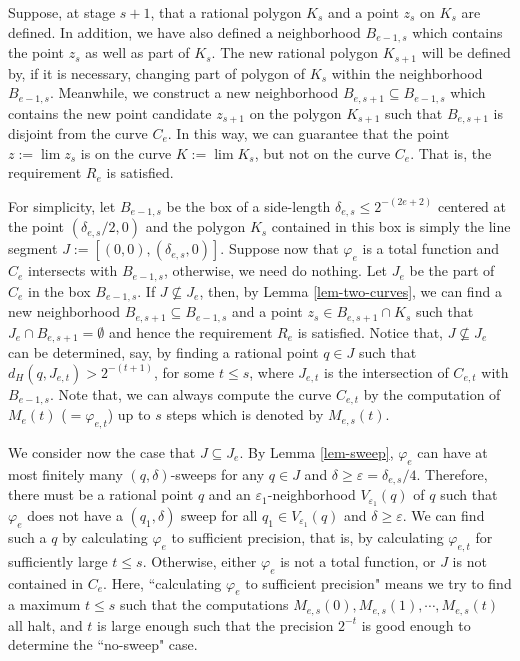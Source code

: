 \documentclass{LMCS}
\theoremstyle{plain}
\begin{document}
Suppose, at stage $s+1$, that a rational polygon $K_s$ and a point $z_s$ on $K_s$ are defined. In addition, we have also defined a neighborhood $B_{e-1,s}$ which contains the point $z_s$ as well as part of $K_s$. The new rational polygon $K_{s+1}$ will be defined by, if it is necessary, changing part of polygon of $K_s$ within the neighborhood $B_{e-1,s}$. Meanwhile, we construct a new neighborhood $B_{e,s+1} \subseteq B_{e-1,s}$ which contains the new point candidate $z_{s+1}$ on the polygon $K_{s+1}$ such that $B_{e,s+1}$ is disjoint from the curve $C_e$. In this way, we can guarantee that the point $z:=\lim z_s$ is on the curve $K:=\lim K_s$, but not on the curve $C_e$. That is, the requirement $R_e$ is satisfied.

For simplicity, let $B_{e-1,s}$ be the box of a side-length $\delta_{e,s}\le 2^{-(2e+2)}$ centered at the point $(\delta_{e,s}/2, 0)$ and the polygon $K_s$ contained in this box is simply the line segment $J:=[(0,0),(\delta_{e,s},0)]$.  Suppose now that $\varphi_e$ is a total function and $C_e$ intersects with $B_{e-1,s}$, otherwise, we need do nothing. Let $J_e$ be the part of $C_e$ in the box $B_{e-1,s}$. If $J\not\subseteq J_e$, then, by Lemma \ref{lem-two-curves}, we can find a new neighborhood $B_{e,s+1} \subseteq B_{e-1, s}$ and  a point $z_s \in B_{e,s+1} \cap K_s$ such that $J_e\cap B_{e,s+1} = \emptyset$ and hence the requirement $R_e$ is satisfied. Notice that, $J\not\subseteq J_e$ can be determined, say,  by finding a rational point $q \in J$ such that $d_H(q, J_{e,t}) > 2^{-(t+1)}$, for some $t\le s$, where $J_{e,t}$ is the intersection of $C_{e,t}$ with $B_{e-1,s}$. Note that, we can always compute the curve $C_{e,t}$ by the computation of $M_e(t)$ ($=\varphi_{e,t}$) up to $s$ steps which is denoted by $M_{e,s}(t)$.

We consider now the case that $J\subseteq J_e$. By Lemma \ref{lem-sweep}, $\varphi_e$ can have at most finitely many $(q, \delta)$-sweeps for any $q\in J$ and $\delta \ge \varepsilon = \delta_{e,s}/4$. Therefore, there must be a rational point $q$ and an $\varepsilon_1$-neighborhood $V_{\varepsilon_1}(q)$ of $q$ such that $\varphi_e$ does not have a $(q_1, \delta)$ sweep for all $q_1 \in V_{\varepsilon_1}(q)$ and $\delta\ge \varepsilon$. We can find such a $q$ by calculating $\varphi_e$ to sufficient precision, that is, by calculating $\varphi_{e,t}$ for sufficiently large $t\le s$. Otherwise, either $\varphi_e$ is not a total function, or $J$ is not contained in $C_e$. Here, ``calculating $\varphi_e$ to sufficient precision" means we try to find a maximum $t\le s$ such that the computations $M_{e,s}(0), M_{e,s}(1), \cdots, M_{e,s}(t)$ all halt, and $t$ is large enough such that the precision $2^{-t}$ is good enough to determine the ``no-sweep" case.
\end{document}
